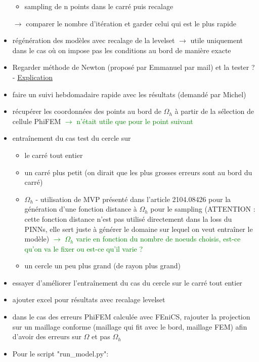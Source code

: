 \begin{itemize}[label=$\square$]
\begin{itemize}[label=\LARGE $\circ$]
		\item sampling de n points dans le carré puis recalage
	\end{itemize}
	$\rightarrow$ comparer le nombre d'itération et garder celui qui est le plus rapide
	\item régénération des modèles avec recalage de la levelset $\rightarrow$ utile uniquement dans le cas où on impose pas les conditions au bord de manière exacte
	\item Regarder méthode de Newton (proposé par Emmanuel par mail) et la tester ? - \href{https://www.mathweb.fr/euclide/methode-de-newton/}{Explication}
	\item[\done] faire un suivi hebdomadaire rapide avec les résultats (demandé par Michel)
	\item[\wontfix] récupérer les coordonnées des points au bord de $\Omega_h$ à partir de la sélection de cellule PhiFEM \textcolor{Green}{$\rightarrow$ n'était utile que pour le point suivant}
	\item entraînement du cas test du cercle sur 
	\begin{itemize}[label=\LARGE $\circ$]
		\item[\sdone] le carré tout entier
		\item un carré plus petit (on dirait que les plus grosses erreurs sont au bord du carré)
		\item[\swontfix] $\Omega_h$ - utilisation de MVP présenté dans l'article 2104.08426 pour la génération d'une fonction distance à $\Omega_h$ pour le sampling (ATTENTION : cette fonction distance n'est pas utilisé directement dans la loss du PINNs, elle sert juste à générer le domaine sur lequel on veut entraîner le modèle) \textcolor{Green}{$\rightarrow$ $\Omega_h$ varie en fonction du nombre de noeuds choisis, est-ce qu'on va le fixer ou est-ce qu'il varie ?}
		\item un cercle un peu plus grand (de rayon plus grand) 
	\end{itemize}
	\item essayer d'améliorer l'entraînement du cas du cercle sur le carré tout entier
	\item ajouter excel pour résultats avec recalage levelset
	\item dans le cas des erreurs PhiFEM calculée avec FEniCS, rajouter la projection sur un maillage conforme (maillage qui fit avec le bord, maillage FEM) afin d'avoir des erreurs sur $\Omega$ et pas $\Omega_h$
	\item Pour le script "run\_model.py":
	\begin{itemize}[label=\LARGE $\circ$]

\end{itemize}
\end{itemize}
